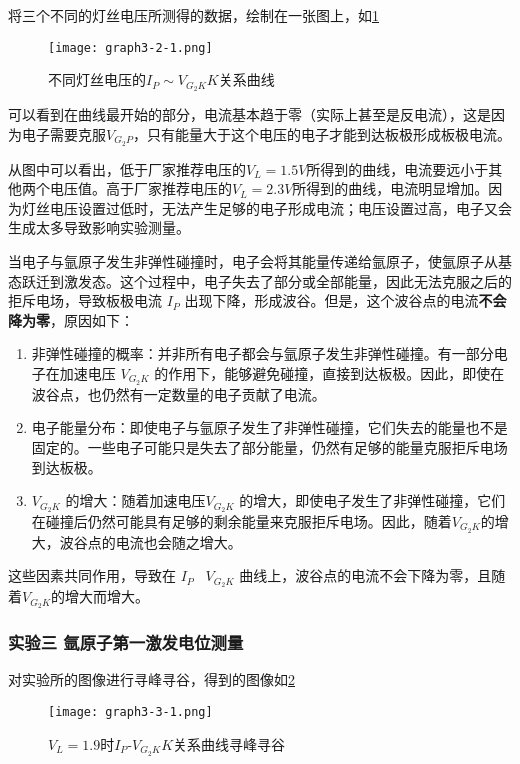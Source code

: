 \documentclass[dvipsnames, svgnames,a4paper,11pt]{article}
\begin{document}
		将三个不同的灯丝电压所测得的数据，绘制在一张图上，如\cref{fig:graph3-2-1}

			\begin{figure}[htbp]
				\centering
				\texttt{[image: graph3-2-1.png]}
				\caption{不同灯丝电压的$I_P\sim V_{G_2K}K$关系曲线}
				\label{fig:graph3-2-1}
			\end{figure}

		可以看到在曲线最开始的部分，电流基本趋于零（实际上甚至是反电流），这是因为电子需要克服$V_{G_2P}$，只有能量大于这个电压的电子才能到达板极形成板极电流。

		从图中可以看出，低于厂家推荐电压的$V_L=1.5V$所得到的曲线，电流要远小于其他两个电压值。高于厂家推荐电压的$V_L=2.3V$所得到的曲线，电流明显增加。因为灯丝电压设置过低时，无法产生足够的电子形成电流；电压设置过高，电子又会生成太多导致影响实验测量。

		当电子与氩原子发生非弹性碰撞时，电子会将其能量传递给氩原子，使氩原子从基态跃迁到激发态。这个过程中，电子失去了部分或全部能量，因此无法克服之后的拒斥电场，导致板极电流  $I_P$  出现下降，形成波谷。但是，这个波谷点的电流\textbf{不会降为零}，原因如下：

		\begin{enumerate}
			\item 非弹性碰撞的概率：并非所有电子都会与氩原子发生非弹性碰撞。有一部分电子在加速电压 $V_{G_2K}$  的作用下，能够避免碰撞，直接到达板极。因此，即使在波谷点，也仍然有一定数量的电子贡献了电流。
			\item 电子能量分布：即使电子与氩原子发生了非弹性碰撞，它们失去的能量也不是固定的。一些电子可能只是失去了部分能量，仍然有足够的能量克服拒斥电场到达板极。
			\item $ V_{G_2K}$  的增大：随着加速电压$ V_{G_2K}$ 的增大，即使电子发生了非弹性碰撞，它们在碰撞后仍然可能具有足够的剩余能量来克服拒斥电场。因此，随着$ V_{G_2K}$的增大，波谷点的电流也会随之增大。
		\end{enumerate}
		
		这些因素共同作用，导致在 $ I_P$ ~$ V_{G_2K}$ 曲线上，波谷点的电流不会下降为零，且随着$ V_{G_2K}$的增大而增大。


	\subsubsection{实验三 \quad 氩原子第一激发电位测量}
				
		对实验所的图像进行寻峰寻谷，得到的图像如\cref{fig:graph3-3-1}
		\begin{figure}[htbp]
			\centering
			\texttt{[image: graph3-3-1.png]}
			\caption{$V_L=1.9$时$I_P$-$V_{G_2K}K$关系曲线寻峰寻谷}
			\label{fig:graph3-3-1}
		\end{figure}
			
\end{document}

